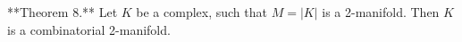 **Theorem 8.** Let $K$ be a complex, such that $M = |K|$ is a 2-manifold. Then $K$ is a combinatorial 2-manifold.
